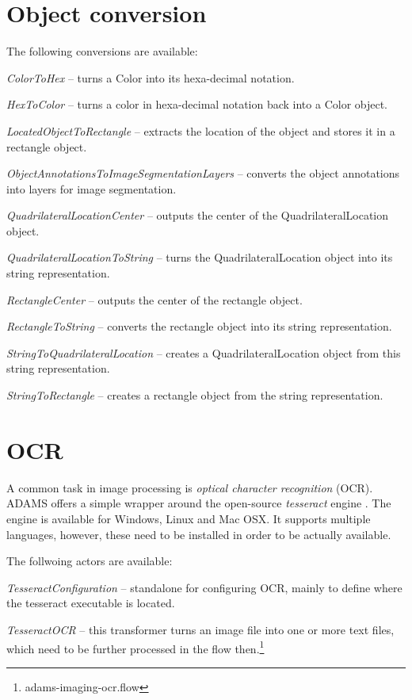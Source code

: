 \documentclass[a4paper]{book}
\begin{document}
\chapter{Object conversion}
The following conversions are available:
\begin{tight_itemize}
  \item \textit{ColorToHex} -- turns a Color into its hexa-decimal
  notation.
  \item \textit{HexToColor} -- turns a color in hexa-decimal notation back
  into a Color object.
  \item \textit{LocatedObjectToRectangle} -- extracts the location of the
  object and stores it in a rectangle object.
  \item \textit{ObjectAnnotationsToImageSegmentationLayers} -- converts the
  object annotations into layers for image segmentation.
  \item \textit{QuadrilateralLocationCenter} -- outputs the center of the
  QuadrilateralLocation object.
  \item \textit{QuadrilateralLocationToString} -- turns the
  QuadrilateralLocation object into its string representation.
  \item \textit{RectangleCenter} -- outputs the center of the rectangle object.
  \item \textit{RectangleToString} -- converts the rectangle object into its
  string representation.
  \item \textit{StringToQuadrilateralLocation} -- creates a QuadrilateralLocation
  object from this string representation.
  \item \textit{StringToRectangle} -- creates a rectangle object from the string
  representation.
\end{tight_itemize}


\chapter{OCR}
A common task in image processing is \textit{optical character recognition} 
(OCR). ADAMS offers a simple wrapper around the open-source \textit{tesseract} 
engine \cite{tesseract}. The engine is available for Windows, Linux and Mac OSX.
It supports multiple languages, however, these need to be installed in order to
be actually available.

The follwoing actors are available:
\begin{tight_itemize}
	\item \textit{TesseractConfiguration} -- standalone for configuring OCR, 
	mainly to define where the tesseract executable is located.
	\item \textit{TesseractOCR} -- this transformer turns an image file into
	one or more text files, which need to be further processed in the flow
	then.\footnote{adams-imaging-ocr.flow}
\end{tight_itemize}
\end{document}
